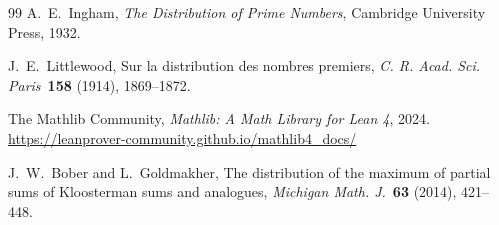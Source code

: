 \documentclass[12pt]{article}
\theoremstyle{plain}
\theoremstyle{definition}
\begin{document}
\begin{thebibliography}{99}
A.~E.~Ingham,
\emph{The Distribution of Prime Numbers},
Cambridge University Press, 1932.

J.~E.~Littlewood,
Sur la distribution des nombres premiers,
\emph{C. R. Acad. Sci. Paris}\ \textbf{158} (1914), 1869--1872.

The Mathlib Community,
\emph{Mathlib: A Math Library for Lean 4}, 2024.
\url{https://leanprover-community.github.io/mathlib4_docs/}

J.~W.~Bober and L.~Goldmakher,
The distribution of the maximum of partial sums of Kloosterman sums
and analogues,
\emph{Michigan Math. J.}\ \textbf{63} (2014), 421--448.

\end{thebibliography}
\end{document}
